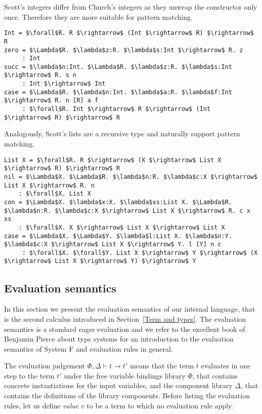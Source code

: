 Scott's integers differ from Church's integers as they unwrap the constructor only once. Therefore they are more suitable for pattern matching.
\begin{lstlisting}[style=plain, mathescape]
Int = $\forall$R. R $\rightarrow$ (Int $\rightarrow$ R) $\rightarrow$ R
zero = $\Lambda$R. $\lambda$z:R. $\lambda$s:Int $\rightarrow$ R. z
     : Int
succ = $\lambda$n:Int. $\Lambda$R. $\lambda$z:R. $\lambda$s:Int $\rightarrow$ R. s n
     : Int $\rightarrow$ Int
case = $\Lambda$R. $\lambda$n:Int. $\lambda$a:R. $\lambda$f:Int $\rightarrow$ R. n [R] a f
     : $\forall$R. Int $\rightarrow$ R $\rightarrow$ (Int $\rightarrow$ R) $\rightarrow$ R
\end{lstlisting}

Analogously, Scott's lists are a recursive type and naturally support pattern matching.
\begin{lstlisting}[style=plain, mathescape]
List X = $\forall$R. R $\rightarrow$ (X $\rightarrow$ List X $\rightarrow$ R) $\rightarrow$ R
nil = $\Lambda$X. $\Lambda$R. $\lambda$n:R. $\lambda$c:X $\rightarrow$ List X $\rightarrow$ R. n
    : $\forall$X. List X
con = $\Lambda$X. $\lambda$x:X. $\lambda$xs:List X. $\Lambda$R. $\lambda$n:R. $\lambda$c:X $\rightarrow$ List X $\rightarrow$ R. c x xs
    : $\forall$X. X $\rightarrow$ List X $\rightarrow$ List X
case = $\Lambda$X. $\Lambda$Y. $\lambda$l:List X. $\lambda$n:Y. $\lambda$c:X $\rightarrow$ List X $\rightarrow$ Y. l [Y] n c
     : $\forall$X. $\forall$Y. List X $\rightarrow$ Y $\rightarrow$ (X $\rightarrow$ List X $\rightarrow$ Y) $\rightarrow$ Y
\end{lstlisting} 
 
  \subsection{Evaluation semantics}
In this section we present the evaluation semantics of our internal language, that is the second calculus introduced in Section~\ref{Term and types}. The evaluation semantics is a standard eager evaluation and we refer to the excellent book of Benjamin Pierce about type systems \cite{pierce2002types} for an introduction to the evaluation semantics of System F and evaluation rules in general.

The evaluation judgement $\Phi, \Delta \vdash t \longrightarrow t'$ means that the term $t$ evaluates in one step to the term $t'$ under the free variable bindings library $\Phi$, that contains concrete instantiations for the input variables, and the component library $\Delta$, that contains the definitions of the library components. Before listing the evaluation rules, let us define \emph{value} $v$ to be a term to which no evaluation rule apply.

